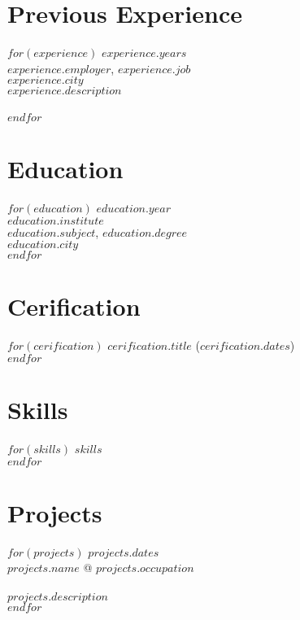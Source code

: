 \documentclass[$fontsize$, a4paper]{article}
\begin{document}
\vspace{-15pt}

\section*{Previous Experience}
\noindent
$for(experience)$
\footnotesize{$experience.years$}\\
\textsc{$experience.employer$}, \emph{$experience.job$}\\
$experience.city$\\[.2cm]
$experience.description$\\\\
$endfor$

\vspace{-15pt}

\begin{multicols}{2}

\section*{Education}
\noindent
$for(education)$
\footnotesize{$education.year$}\\
\emph{$education.institute$}\\
\textbf{$education.subject$}, $education.degree$\\
$education.city$\\[.2cm]
$endfor$

\columnbreak

\section*{Cerification}
$for(cerification)$
$cerification.title$ ($cerification.dates$)\\
$endfor$

\section*{Skills}
$for(skills)$
$skills$\\
$endfor$

\end{multicols}




\pagebreak

\section*{Projects}
$for(projects)$
\footnotesize{$projects.dates$}\\
\textbf{$projects.name$} @ \emph{$projects.occupation$}\\\\
$projects.description$\\
$endfor$
\end{document}
